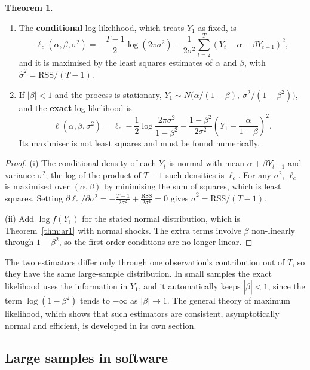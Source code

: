 \documentclass[11pt,a4paper]{article}
\numberwithin{equation}{section}
\theoremstyle{definition}
\newtheorem{thm}{Theorem}[subsection]
\begin{document}
\begin{thm}
\label{thm:ar1ml}
\begin{enumerate}[label=(\roman*)]
\item The \textbf{conditional} log-likelihood, which treats $Y_1$ as fixed, is
\[
\ell_c(\alpha, \beta, \sigma^2) = -\frac{T-1}{2}\log(2\pi\sigma^2) - \frac{1}{2\sigma^2}\sum_{t=2}^T (Y_t - \alpha - \beta Y_{t-1})^2 ,
\]
and it is maximised by the least squares estimates of $\alpha$ and $\beta$, with $\hat\sigma^2 = \text{RSS}/(T - 1)$.
\item If $|\beta| < 1$ and the process is stationary, $Y_1 \sim N\bigl(\alpha/(1 - \beta),\ \sigma^2/(1 - \beta^2)\bigr)$, and the \textbf{exact} log-likelihood is
\[
\ell(\alpha, \beta, \sigma^2) = \ell_c - \frac12\log\frac{2\pi\sigma^2}{1 - \beta^2} - \frac{1 - \beta^2}{2\sigma^2}\left(Y_1 - \frac{\alpha}{1 - \beta}\right)^2 .
\]
Its maximiser is not least squares and must be found numerically.
\end{enumerate}
\end{thm}

\begin{proof}
(i) The conditional density of each $Y_t$ is normal with mean $\alpha + \beta Y_{t-1}$ and variance $\sigma^2$; the log of the product of $T - 1$ such
densities is $\ell_c$. For any $\sigma^2$, $\ell_c$ is maximised over $(\alpha, \beta)$ by minimising the sum of squares, which is least squares.
Setting $\partial\ell_c/\partial\sigma^2 = -\frac{T-1}{2\sigma^2} + \frac{\text{RSS}}{2\sigma^4} = 0$ gives $\hat\sigma^2 = \text{RSS}/(T - 1)$.

(ii) Add $\log f(Y_1)$ for the stated normal distribution, which is Theorem~\ref{thm:ar1} with normal shocks. The extra terms involve $\beta$
non-linearly through $1 - \beta^2$, so the first-order conditions are no longer linear.
\end{proof}

The two estimators differ only through one observation's contribution out of $T$, so they have the same large-sample distribution. In small
samples the exact likelihood uses the information in $Y_1$, and it automatically keeps $|\hat\beta| < 1$, since the term $\log(1 - \beta^2)$ tends to
$-\infty$ as $|\beta| \to 1$. The general theory of maximum likelihood, which shows that such estimators are consistent, asymptotically normal and
efficient, is developed in its own section.

\subsection{Large samples in software}
\label{ssec:software4}
\end{document}
